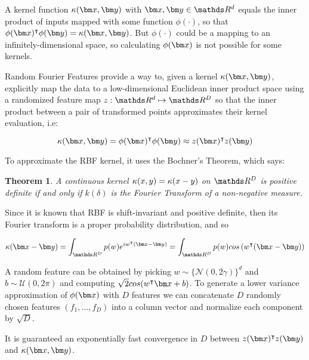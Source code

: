 \begin{pre-delivery}
  A kernel function
  $\kernel(\vx, \vy)$ with $\vx, \vy \in \reals^d$
  equals the inner product of inputs mapped with some function $\phi(\cdot)$,
  so that
  $\phi(\vx)^\transp\phi(\vy) = \kernel(\vx, \vy)$.
  But $\phi(\cdot)$ could be a mapping to an infinitely-dimensional space, so
  calculating $\phi(\vx)$ is not possible for some kernels.

  Random Fourier Features\cite{rahimi2008random} provide a way to, given a
  kernel $\kernel(\vx, \vy)$,
  explicitly map the data to a
  low-dimensional Euclidean inner product space using a randomized feature
  map $z: \reals^d \mapsto \reals^D$ so that the inner product between a pair
  of transformed points approximates their kernel evaluation, i.e:

  \begin{equation}
    \kernel(\vx, \vy) = \phi(\vx)^\transp\phi(\vy) \approx z(\vx)^\transp z(\vy)
  \end{equation}

  To approximate the RBF kernel, it uses the Bochner's Theorem, which says:

\newtheorem{theorem}{Theorem}
  \begin{theorem}
    \cite{rudin1962fourier}
    A continuous kernel $\kappa(x, y) = \kappa(x - y)$ on $\reals^D$  is
    positive definite if and only if $k(\delta)$ is the
    Fourier Transform of a non-negative measure.
  \end{theorem}


  Since it is known that RBF is shift-invariant and positive definite, then
  its Fourier transform is a proper probability distribution, and so

  \begin{equation}
    \kernel(\vx - \vy) = \int_{\reals^D} p(w)e^{iw^\transp (\vx-\vy)}
    = \int_{\reals^D} p(w)cos\left(w^\transp (\vx-\vy)\right)
  \end{equation}

  A random feature can be obtained by picking $w \sim \{\mathcal{N}(0, 2\gamma)\}^d$
  and $b \sim \mathcal{U}(0, 2\pi)$
  and computing $\sqrt{2}cos(w^\transp\vx + b)$. To generate a lower variance
  approximation of $\phi(\vx)$ with $D$ features we can concatenate $D$ randomly
  chosen features $(f_1, \ldots, f_D)$ into a column vector and normalize each
  component by $\sqrt{D}$.

  It is guaranteed an exponentially fast convergence in $D$ between
  $z(\vx)^\transp z(\vy)$ and $\kernel(\vx, \vy)$.

\end{pre-delivery}

